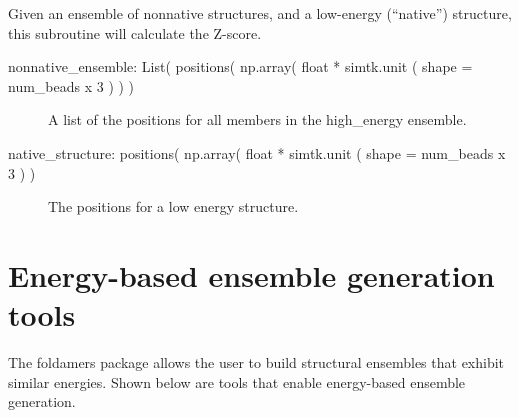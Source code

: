 \documentclass[letterpaper,12pt,english,openany,oneside]{sphinxmanual}
\begin{document}

\begin{fulllineitems}
\label{\detokenize{ensembles:ensembles.ens_build.z_score}}
Given an ensemble of nonnative structures, and a low-energy (“native”) structure, this subroutine will calculate the Z-score.
\begin{description}
\item[{nonnative\_ensemble: List( positions( np.array( float * simtk.unit ( shape = num\_beads x 3 ) ) )}] \leavevmode
A list of the positions for all members in the high\_energy ensemble.

\item[{native\_structure: positions( np.array( float * simtk.unit ( shape = num\_beads x 3 ) )}] \leavevmode
The positions for a low energy structure.

\end{description}

\end{fulllineitems}



\section{Energy-based ensemble generation tools}
\label{\detokenize{ensembles:energy-based-ensemble-generation-tools}}
The foldamers package allows the user to build structural ensembles that exhibit similar energies.  Shown below are tools that enable energy-based ensemble generation.

\label{\detokenize{ensembles:module-ensembles.ens_build}}
\end{document}
